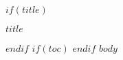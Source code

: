 \documentclass{article}
\begin{document}
$if(title)$
\begin{center}
    {\Huge \textbf{\color{azureblue}$title$} \par}
    \vspace{1cm}
\end{center}
$endif$
$if(toc)$
{
  \hypersetup{linkcolor=azureblue}
  \tableofcontents
  \newpage
}
$endif$
$body$
\end{document}
